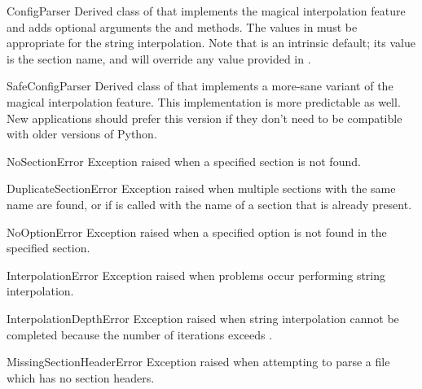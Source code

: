 \begin{classdesc}{ConfigParser}{}
Derived class of  that implements the magical
interpolation feature and adds optional arguments the 
and  methods.  The values in  must be
appropriate for the  string interpolation.  Note that
 is an intrinsic default; its value is the section name,
and will override any value provided in .
\end{classdesc}

\begin{classdesc}{SafeConfigParser}{}
Derived class of  that implements a more-sane
variant of the magical interpolation feature.  This implementation is
more predictable as well.
New applications should prefer this version if they don't need to be
compatible with older versions of Python.
\end{classdesc}

\begin{excdesc}{NoSectionError}
Exception raised when a specified section is not found.
\end{excdesc}

\begin{excdesc}{DuplicateSectionError}
Exception raised when multiple sections with the same name are found,
or if  is called with the name of a section that 
is already present.
\end{excdesc}

\begin{excdesc}{NoOptionError}
Exception raised when a specified option is not found in the specified 
section.
\end{excdesc}

\begin{excdesc}{InterpolationError}
Exception raised when problems occur performing string interpolation.
\end{excdesc}

\begin{excdesc}{InterpolationDepthError}
Exception raised when string interpolation cannot be completed because
the number of iterations exceeds .
\end{excdesc}

\begin{excdesc}{MissingSectionHeaderError}
Exception raised when attempting to parse a file which has no section
headers.
\end{excdesc}

